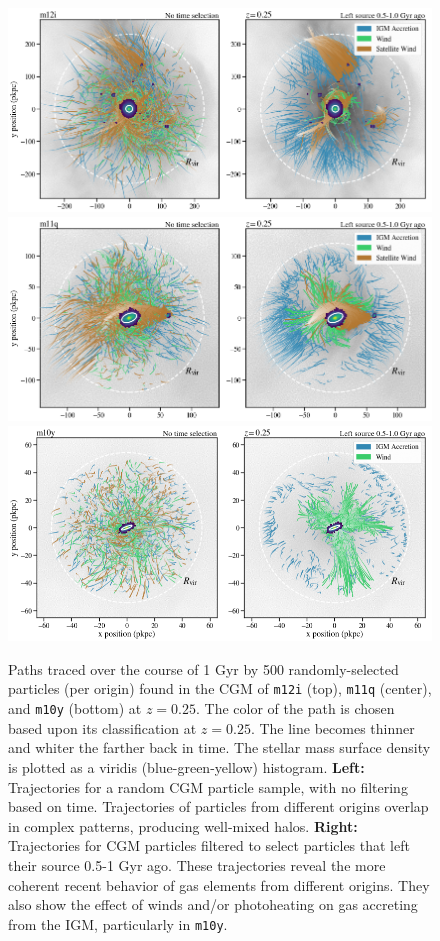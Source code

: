 \documentclass[fleqn,usenatbib]{mnras}
\begin{document}
\begin{figure}
\centering
\includegraphics[height=0.29\textheight]{figures/streamlines_m12i_CGM_snum465_galdefv3.png}
\includegraphics[height=0.29\textheight]{figures/streamlines_m11q_CGM_snum465_galdefv3.png}
\includegraphics[height=0.305\textheight]{figures/streamlines_m10y_CGM_snum465_galdefv3.png}
\caption{
Paths traced over the course of 1 Gyr by 500 randomly-selected particles (per origin) found in the CGM of \texttt{m12i} (top), \texttt{m11q} (center), and \texttt{m10y} (bottom) at $z=0.25$.
The color of the path is chosen based upon its classification at $z=0.25$.
The line becomes thinner and whiter the farther back in time.
The stellar mass surface density  is plotted as a viridis (blue-green-yellow) histogram. 
\textbf{Left:} Trajectories for a random CGM particle sample, with no filtering based on time. 
Trajectories of particles from different origins overlap in complex patterns, producing well-mixed halos. 
\textbf{Right:} Trajectories for CGM particles filtered to select particles that left their source 0.5-1 Gyr ago. 
These trajectories reveal the more coherent recent behavior of gas elements from different origins.
They also show the effect of winds and/or photoheating on gas accreting from the IGM, particularly in \texttt{m10y}.
}
\label{fig:pathlines_CGM_snum465}
\end{figure}
\end{document}
